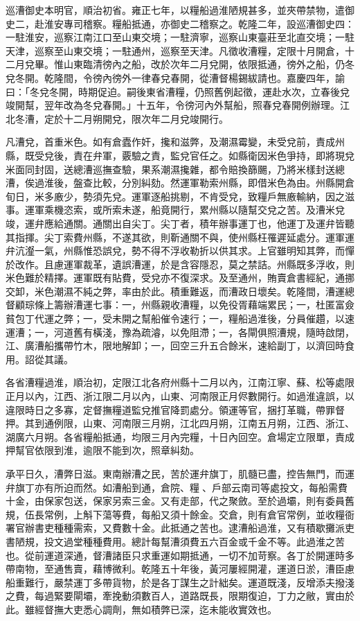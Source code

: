 \begin{pinyinscope}
巡漕御史本明官，順治初省。雍正七年，以糧船過淮陋規甚多，並夾帶禁物，遣御史二，赴淮安專司稽察。糧船抵通，亦御史二稽察之。乾隆二年，設巡漕御史四：一駐淮安，巡察江南江口至山東交境；一駐濟寧，巡察山東臺莊至北直交境；一駐天津，巡察至山東交境；一駐通州，巡察至天津。凡徵收漕糧，定限十月開倉，十二月兌畢。惟山東臨清徬內之船，改於次年二月兌開，依限抵通，徬外之船，仍冬兌冬開。乾隆間，令徬內徬外一律春兌春開，從漕督楊錫紱請也。嘉慶四年，諭曰：「冬兌冬開，時期促迫。嗣後東省漕糧，仍照舊例起徵，運赴水次，立春後兌竣開幫，翌年改為冬兌春開。」十五年，令徬河內外幫船，照春兌春開例辦理。江北冬漕，定於十二月朔開兌，限次年二月兌竣開行。

凡漕兌，首重米色。如有倉蠹作奸，攙和滋弊，及潮濕霉變，未受兌前，責成州縣，既受兌後，責在弁軍，覈驗之責，監兌官任之。如縣衛因米色爭持，即將現兌米面同封固，送總漕巡撫查驗，果系潮濕攙雜，都令賠換篩颺，乃將米樣封送總漕，俟過淮後，盤查比較，分別糾劾。然運軍勒索州縣，即借米色為由。州縣開倉旬日，米多廒少，勢須先兌。運軍逐船挑剔，不肯受兌，致糧戶無廒輸納，因之滋事。運軍乘機恣索，或所索未遂，船竟開行，累州縣以隨幫交兌之苦。及漕米兌竣，運弁應給通關。通關出自尖丁。尖丁者，積年辦事運丁也，他運丁及運弁皆聽其指揮。尖丁索費州縣，不遂其欲，則靳通關不與，使州縣枉罹遲延處分。運軍運弁沆瀣一氣，州縣惟恐誤兌，勢不得不浮收勒折以供其求。上官雖明知其弊，而憚於改作。且慮運軍裁革，遺誤漕運，於是含容隱忍，莫之禁詰。州縣既多浮收，則米色難於精擇。運軍既有貼費，受兌亦不復深求。及至通州，賄賣倉書經紀，通挪交卸，米色潮濕不純之弊，率由於此。積重難返，而漕政日壞矣。乾隆間，漕運總督顧琮條上籌辦漕運七事：一，州縣親收漕糧，以免役胥藉端累民；一，杜匿富僉貧包丁代運之弊；一，受未開之幫船催令速行；一，糧船過淮後，分員催趲，以速運漕；一，河道舊有橫淺，豫為疏濬，以免阻滯；一，各閘俱照漕規，隨時啟閉，江、廣漕船攜帶竹木，限地解卸；一，回空三升五合餘米，速給副丁，以濟回時食用。詔從其議。

各省漕糧過淮，順治初，定限江北各府州縣十二月以內，江南江寧、蘇、松等處限正月以內，江西、浙江限二月以內，山東、河南限正月侭數開行。如過淮違誤，以違限時日之多寡，定督撫糧道監兌推官降罰處分。領運等官，捆打革職，帶罪督押。其到通例限，山東、河南限三月朔，江北四月朔，江南五月朔，江西、浙江、湖廣六月朔。各省糧船抵通，均限三月內完糧，十日內回空。倉場定立限單，責成押幫官依限到淮，逾限不能到次，照章糾劾。

承平日久，漕弊日滋。東南辦漕之民，苦於運弁旗丁，肌髓已盡，控告無門，而運弁旗丁亦有所迫而然。如漕船到通，倉院、糧、戶部云南司等處投文，每船需費十金，由保家包送，保家另索三金。又有走部，代之聚斂。至於過壩，則有委員舊規，伍長常例，上斛下蕩等費，每船又須十餘金。交倉，則有倉官常例，並收糧衙署官辦書吏種種需索，又費數十金。此抵通之苦也。逮漕船過淮，又有積歇攤派吏書陋規，投文過堂種種費用。總計每幫漕須費五六百金或千金不等。此過淮之苦也。從前運道深通，督漕諸臣只求重運如期抵通，一切不加苛察。各丁於開運時多帶南物，至通售賣，藉博微利。乾隆五十年後，黃河屢經開灌，運道日淤，漕臣慮船重難行，嚴禁運丁多帶貨物，於是各丁謀生之計絀矣。運道既淺，反增添夫撥淺之費，每過緊要閘壩，牽挽動須數百人，道路既長，限期復迫，丁力之敝，實由於此。雖經督撫大吏悉心調劑，無如積弊已深，迄未能收實效也。


\end{pinyinscope}
